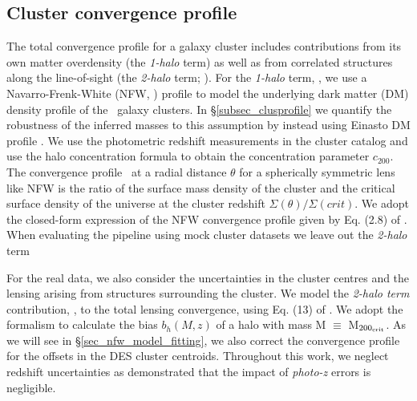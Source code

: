 \documentclass[usenatbib, twocolumn, nofootinbib, reprint]{aastex61}
\newcommand{\pending}[1]{\textcolor{red}{#1}}
\newcommand{\mvir}{M$_{200_{\rm crit}}$}
\begin{document}
\subsection{Cluster convergence profile}
\label{sec_clus_profile} 

The total convergence profile for a galaxy cluster includes contributions from its own matter overdensity (the {\it 1-halo} term) as well as from correlated structures along the line-of-sight (the {\it 2-halo} term; \citealt{seljak00a,cooray02}). 
For the {\it 1-halo} term, \kappaonehalomz, we use a Navarro-Frenk-White (NFW, \citealt{navarro96}) profile to model the underlying dark matter (DM) density profile of the \desrm\ galaxy clusters. 
In \S\ref{subsec_clusprofile} we %
quantify the robustness of the inferred masses to this assumption by instead using Einasto DM profile \citep{einasto89}. 
We use the photometric redshift measurements in the \desrm{} cluster catalog and use the \citet{duffy08} halo concentration formula to obtain the concentration parameter $c_{200}$. 
The convergence profile \kappaonehalofull\ at a radial distance $\theta$ for a spherically symmetric lens like NFW is the ratio of the surface mass density of the cluster and the critical surface density of the universe at the cluster redshift $\Sigma(\theta)/\Sigma(crit)$. 
We adopt the closed-form expression of the NFW convergence profile given by Eq. (2.8) of \citet{bartelmann96}. 
When evaluating the pipeline using mock cluster datasets we leave out the {\it 2-halo} term

For the real data, we also consider the uncertainties in the cluster centres and the lensing arising from structures surrounding the cluster.
We model the {\it 2-halo term} contribution, \kappatwohalomz, to the total lensing convergence, using Eq. (13) of \citet{oguri11}. 
We adopt the \citet{tinker10} formalism to calculate the bias $b_h(M,z)$ of a halo with mass M $\equiv$ \mvir. 
As we will see in \S\ref{sec_nfw_model_fitting}, we also correct the convergence profile for the offsets in the DES cluster centroids.
Throughout this work, we neglect redshift uncertainties as  demonstrated that the impact of \emph{photo-z} errors is negligible.  

\end{document}
